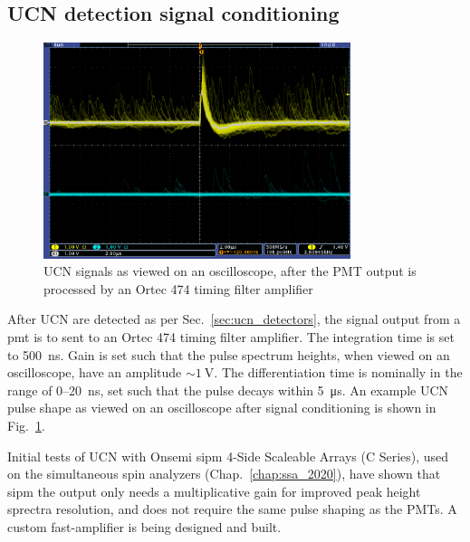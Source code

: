 
\subsection{UCN detection signal conditioning}\label{sec:signal_conditioning}


 \begin{figure}
    \centering
    \includegraphics[width=0.8\textwidth]{figures/pmt_scope.png}
    \caption
     {UCN signals as viewed on an oscilloscope, after the PMT output is processed by an Ortec 474 timing filter amplifier}
    \label{fig:scope_image}
\end{figure}

After UCN are detected as per Sec.~\ref{sec:ucn_detectors}, the signal output from a \gls*{pmt} is to sent to an Ortec 474 timing filter amplifier. The integration time is set to \qty{500}{\nano\second}. Gain is set such that the pulse spectrum heights, when viewed on an oscilloscope, have an amplitude $\sim\qty{1}{\volt}$. The differentiation time is nominally in the range of 0--\qty{20}{\nano\second}, set such that the pulse decays within \qty{5}{\micro \second}. An example UCN pulse shape as viewed on an oscilloscope after signal conditioning is shown in Fig.~\ref{fig:scope_image}.

Initial tests of UCN with Onsemi \acrshort*{sipm} 4-Side Scaleable Arrays (C Series), used on the simultaneous spin analyzers (Chap.~\ref{chap:ssa_2020}), have shown that \acrshort*{sipm} the output only needs a multiplicative gain for improved peak height sprectra resolution, and does not require the same pulse shaping as the PMTs. A custom fast-amplifier is being designed and built.

